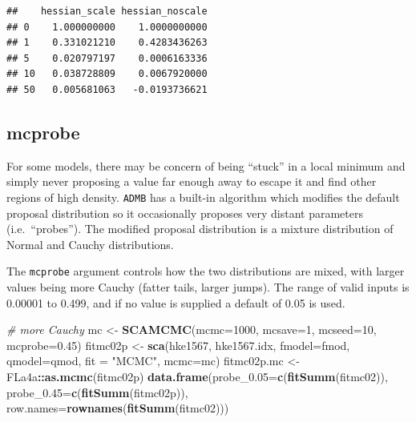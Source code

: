\documentclass[
]{book}
\newenvironment{Shaded}{\begin{snugshade}}{\end{snugshade}}
\newcommand{\AttributeTok}[1]{\textcolor[rgb]{0.13,0.29,0.53}{#1}}
\newcommand{\CommentTok}[1]{\textcolor[rgb]{0.56,0.35,0.01}{\textit{#1}}}
\newcommand{\DecValTok}[1]{\textcolor[rgb]{0.00,0.00,0.81}{#1}}
\newcommand{\FloatTok}[1]{\textcolor[rgb]{0.00,0.00,0.81}{#1}}
\newcommand{\FunctionTok}[1]{\textcolor[rgb]{0.13,0.29,0.53}{\textbf{#1}}}
\newcommand{\NormalTok}[1]{#1}
\newcommand{\OtherTok}[1]{\textcolor[rgb]{0.56,0.35,0.01}{#1}}
\newcommand{\SpecialCharTok}[1]{\textcolor[rgb]{0.81,0.36,0.00}{\textbf{#1}}}
\newcommand{\StringTok}[1]{\textcolor[rgb]{0.31,0.60,0.02}{#1}}
\begin{document}
\begin{verbatim}
##    hessian_scale hessian_noscale
## 0    1.000000000    1.0000000000
## 1    0.331021210    0.4283436263
## 5    0.020797197    0.0006163336
## 10   0.038728809    0.0067920000
## 50   0.005681063   -0.0193736621
\end{verbatim}

\hypertarget{mcprobe}{%
\subsection{mcprobe}\label{mcprobe}}

For some models, there may be concern of being ``stuck'' in a local minimum and simply never proposing a value far enough away to escape it and find other regions of high density. \texttt{ADMB} has a built-in algorithm which modifies the default proposal distribution so it occasionally proposes very distant parameters (i.e.~``probes''). The modified proposal distribution is a mixture distribution of Normal and Cauchy distributions.

The \texttt{mcprobe} argument controls how the two distributions are mixed, with larger values being more Cauchy (fatter tails, larger jumps). The range of valid inputs is 0.00001 to 0.499, and if no value is supplied a default of 0.05 is used.

\begin{Shaded}
\begin{Highlighting}[]
\CommentTok{\# more Cauchy}
\NormalTok{mc }\OtherTok{\textless{}{-}} \FunctionTok{SCAMCMC}\NormalTok{(}\AttributeTok{mcmc=}\DecValTok{1000}\NormalTok{, }\AttributeTok{mcsave=}\DecValTok{1}\NormalTok{, }\AttributeTok{mcseed=}\DecValTok{10}\NormalTok{, }\AttributeTok{mcprobe=}\FloatTok{0.45}\NormalTok{)}
\NormalTok{fitmc02p }\OtherTok{\textless{}{-}} \FunctionTok{sca}\NormalTok{(hke1567, hke1567.idx, }\AttributeTok{fmodel=}\NormalTok{fmod, }\AttributeTok{qmodel=}\NormalTok{qmod, }\AttributeTok{fit =} \StringTok{"MCMC"}\NormalTok{, }\AttributeTok{mcmc=}\NormalTok{mc)}
\NormalTok{fitmc02p.mc }\OtherTok{\textless{}{-}}\NormalTok{ FLa4a}\SpecialCharTok{::}\FunctionTok{as.mcmc}\NormalTok{(fitmc02p)}
\FunctionTok{data.frame}\NormalTok{(}\AttributeTok{probe\_0.05=}\FunctionTok{c}\NormalTok{(}\FunctionTok{fitSumm}\NormalTok{(fitmc02)),}
    \AttributeTok{probe\_0.45=}\FunctionTok{c}\NormalTok{(}\FunctionTok{fitSumm}\NormalTok{(fitmc02p)),}
    \AttributeTok{row.names=}\FunctionTok{rownames}\NormalTok{(}\FunctionTok{fitSumm}\NormalTok{(fitmc02)))}
\end{Highlighting}
\end{Shaded}
\end{document}
